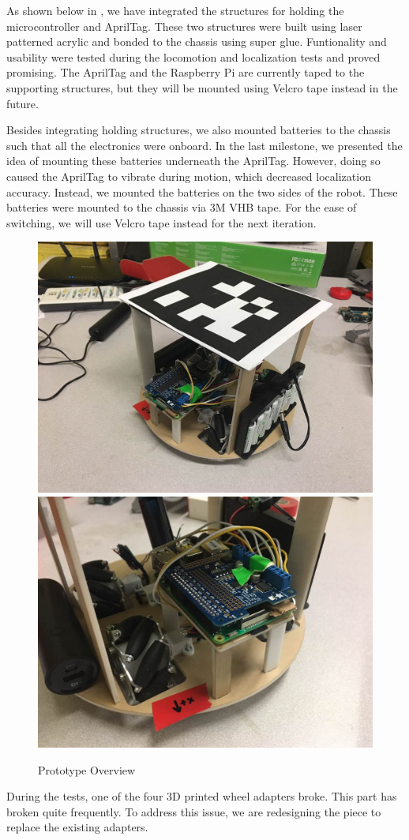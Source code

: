 As shown below in , we have integrated the structures for holding the microcontroller and AprilTag. These two structures were built using laser patterned acrylic and bonded to the chassis using super glue. Funtionality and usability were tested during the locomotion and localization tests and proved promising. The AprilTag and the Raspberry Pi are currently taped to the supporting structures, but they will be mounted using Velcro tape instead in the future. 

Besides integrating holding structures, we also mounted batteries to the chassis such that all the electronics were onboard. In the last milestone, we presented the idea of mounting these batteries underneath the AprilTag. However, doing so caused the AprilTag to vibrate during motion, which decreased localization accuracy.  Instead, we mounted the batteries on the two sides of the robot. These batteries were mounted to the chassis via 3M VHB tape. For the ease of switching, we will use Velcro tape instead for the next iteration. 

\begin{figure}[h!]
\centering
\includegraphics[width=0.49\columnwidth]{figs/robot1.jpeg}
\includegraphics[width=0.49\columnwidth]{figs/robot2.jpeg}
\caption{Prototype Overview}
\label{fig:em1}
\end{figure}

During the tests, one of the four 3D printed wheel adapters broke. This part has  broken quite frequently. To address this issue, we are redesigning the piece to replace the existing adapters. 

